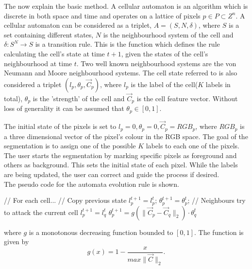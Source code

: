 \documentclass[a4paper,10pt]{article}
\begin{document}
\noindent The now explain the basic method.  A
cellular automaton is an algorithm which is discrete in both space and time
and operates on a lattice of pixels $p \in P \subset Z^{n}$.  A cellular
automaton can be considered as a triplet, $A = (S, N, \delta)$, where $S$ is a
set containing different states, $N$ is the
neighbourhood system of the cell and $\delta: S^{N} \rightarrow S $ is a
transition rule.  This is the function which defines  the rule calculating the
cell's state at time $t + 1$, given the states 
of the cell's neighbourhood at time $t$.  Two well known neighbourhood systems
are the von Neumann and Moore neighbourhood systems.  The cell state referred to
is also
considered a triplet $(l_{p}, \theta_{p}, \overrightarrow{C}_{p})$, where
$l_{p}$ is the label of the cell($K$ labels in total), $\theta_{p}$ is the
'strength' of the cell and $\overrightarrow{C}_{p}$ is
the cell feature vector.  Without loss of generality it can be assumed that
$\theta_{p} \in [0,1]$. 

The initial state of the pixels is set to $l_{p} = 0, \theta_{p} = 0,
\overrightarrow{C}_{p} = RGB_{p}$, where $RGB_{p}$ is a three dimensional vector
of the pixel's colour in 
the RGB space.  The goal of the segmentation is to assign one of the possible
$K$ labels to each one of the pixels.  The user starts the segmentation by
marking specific pixels as foreground and others as background.  This sets the
initial state of each pixel.  While the labels are being updated, the user can
correct and guide the process if desired.  \\

\noindent The pseudo code for the automata evolution rule is shown\cite{alg}.
\begin{algorithm}[H]
\begin{algorithmic}[1]
 \State // For each cell...
 \State // Copy previous state
 \State $l^{t+1}_{p} = l^{t}_{p}$;
 \State $\theta_{p}^{t+1} = \theta_{p}^{t}$;
 \State // Neighbours try to attack the current cell
 \State $l^{t+1}_{p} = l^{t}_{q}$
 \State $\theta^{t+1}_{p} = g(\| \overrightarrow{C}_{p} - \overrightarrow{C}_{q}
\|_{2}) \cdot \theta^{t}_{q}$
 \EndIf
 \EndFor
 \EndFor
\end{algorithmic}
\end{algorithm}

\noindent where $g$ is a monotonous decreasing function bounded to $[0, 1]$. 
The function is given by
\[
g(x) = 1 - \frac{x}{max\| \overrightarrow{C} \|_{2}}. 
\]
\end{document}
